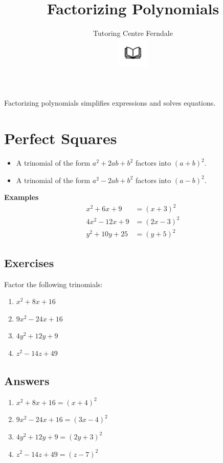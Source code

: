\documentclass[12pt]{article}
\title{\textbf{Factorizing Polynomials}}\\
\author{Tutoring Centre Ferndale\\
\includegraphics[width=4em]{ApS_logo.png}}
\date{}
\begin{document}
\maketitle

Factorizing polynomials simplifies expressions and solves equations.

\section*{Perfect Squares}
\begin{itemize}
\item A trinomial of the form $a^2 + 2ab + b^2$ factors into $(a+b)^2$.
\item A trinomial of the form $a^2 - 2ab + b^2$ factors into $(a-b)^2$.
\end{itemize}

\textbf{Examples}
\begin{align*}
  x^2 + 6x + 9 &= (x+3)^2 \\
4x^2 - 12x + 9 &= (2x-3)^2 \\
y^2 + 10y + 25 &= (y+5)^2
\end{align*}

\subsection*{Exercises}
Factor the following trinomials:
\begin{multicols}{2}
\begin{enumerate}
    \item $x^2 + 8x + 16$
    \item $9x^2 - 24x + 16$
    \item $4y^2 + 12y + 9$
    \item $z^2 - 14z + 49$
\end{enumerate}
\end{multicols}

\newpage

\subsection*{Answers}
\begin{multicols}{2}
\begin{enumerate}
\item $x^2 + 8x + 16 = (x+4)^2$
\item $9x^2 - 24x + 16 = (3x-4)^2$
\item $4y^2 + 12y + 9 = (2y+3)^2$
\item $z^2 - 14z + 49 = (z-7)^2$
\end{enumerate}
\end{multicols}
\end{document}
